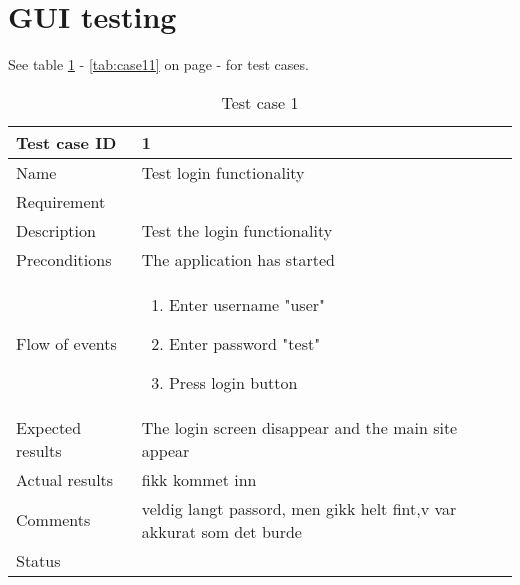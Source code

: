 
\section{GUI testing}

See table \ref{tab:case1} - \ref{tab:case11} on page \pageref{tab:case1} - \pageref{tab:case11} for test cases.
\begin{table}
\begin{tabular}{l|p{10cm}}
Test case ID & 1 \\ \hline
Name & Test login functionality\\ \hline
Requirement & \\ \hline
Description & Test the login functionality\\ \hline
Preconditions & The application has started\\ \hline
Flow of events & 
\begin{enumerate}
\item{}Enter username "user"
\item{}Enter password "test"
\item{}Press login button
\end{enumerate} \\ \hline
Expected results & The login screen disappear and the main site appear\\ \hline \hline
Actual results & fikk kommet inn\\ \hline
Comments & veldig langt passord, men gikk helt fint,v var akkurat som det burde\\ \hline
Status & 
\end{tabular}
\caption{Test case 1} \label{tab:case1}
\end{table}

